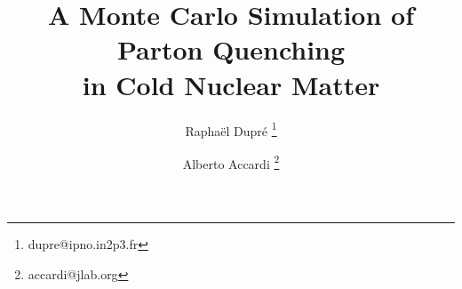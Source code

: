 \newcommand{\ds}{\displaystyle}
\newcommand{\emnr}{\epsilon_{\mu\nu\rho}}
\newcommand{\erre}{{\hbox{{\rm I}\hspace{-.2em}\hbox{\rm R}}}}
\newcommand{\bbeta}{\mbox{\boldmath$\beta$\unboldmath}}
\newcommand{\bb}{{\bf b}}

\newcommand{\cL}{{\mathcal L}}
\newcommand{\lora}{{\longrightarrow}}
\newcommand{\Lora}{{\Longrightarrow}}
\newcommand{\Lolra}{{\Longleftrightarrow}}
\newcommand{\Lra}{{\Leftrightarrow}}
\newcommand{\Ra}{{\Rightarrow}}
\newcommand{\ra}{{\rightarrow}}
\newcommand{\lra}{{\leftrightarrow}}

\newcommand{\bra}[1]{\langle #1 \vert}
\newcommand{\ket}[1]{\vert #1 \rangle}
\newcommand{\scal}[2]{\langle #1 \vert #2 \rangle}
\newcommand{\matel}[3]{\langle #1 \vert #2 \vert #3 \rangle}
\newcommand{\vev}[1]{\langle #1 \rangle}
\newcommand{\vav}[1]{\matel{0}{#1}{0}}
\newcommand{\interno}[2]{\left( #1 , #2 \right)}
\newcommand{\com}[2]{\left[ #1, #2 \right]}

\newcommand{\intmom}[1]{\int {{d^3 #1} \over {(2 \pi)^3}} \,}
\newcommand{\esp}[1]{\, e^{\,\,\textstyle {#1}}}
\newcommand{\In}[2]{ \left. #1 \right| _{#2} }
\newcommand{\Inp}[1]{ {}_{\displaystyle | \scriptstyle #1 } }

\newcommand{\nbar}{{\overline n}}
\newcommand{\mbar}{{\overline m}}
\newcommand{\xbar}{{\overline x}}

\newcommand{\DD}{{\mathcal D}}
\newcommand{\EE}{{\mathcal E}}
\newcommand{\OO}{{\mathcal O}}
\newcommand{\PP}{{\mathcal P}}
\newcommand{\RR}{{\mathcal R}}

\newcommand{\qhat}{{\hat q}}

%

%
\title{A Monte Carlo Simulation of Parton Quenching \\ in Cold Nuclear Matter}
\author{Rapha\"el Dupr\'e \thanks{dupre@ipno.in2p3.fr} 
\and Alberto Accardi \thanks{accardi@jlab.org}}

